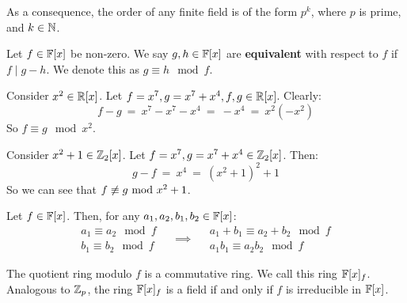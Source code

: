 \documentclass{article}
\begin{document}
\begin{crll}
    As a consequence, the order of any finite field is of the form $ p^{k} $,
    where $ p $ is prime, and $ k \in \mathbb{N} $.
\end{crll}


\begin{defn}
    Let $ f \in \mathbb{F}[x] $ be non-zero.
    We say $ g, h \in \mathbb{F}[x] $ are \textbf{equivalent} with respect to $ f $ if
    $ f \mid g - h $. \vsp
    We denote this as $ g \equiv h \mod f $.
\end{defn}

\begin{xmp}[source=Primary Source Material]
    Consider $ x^{2} \in \mathbb{R}[x] $. Let $ f = x^{7}, g = x^{7} + x^{4}, f, g \in \mathbb{R}[x] $.
    Clearly:
    \begin{equation*}
        f - g \ = \ x^{7} - x^{7} - x^{4} \ = \ -x^{4} \ = \ x^{2}(-x^{2})
    \end{equation*}
    So $ f \equiv g \mod x^{2} $.
\end{xmp}

\begin{xmp}[source=Primary Source Material]
    Consider $ x^{2} + 1 \in \mathbb{Z}_{2}[x] $.
    Let $ f = x^{7}, g = x^{7} + x^{4} \in \mathbb{Z}_{2}[x] $. Then:
    \begin{equation*}
        g - f \ = \ x^{4} \ = \ (x^{2} + 1)^{2} + 1
    \end{equation*}
    So we can see that $ f \cnot\equiv g \mod x^{2} + 1 $.
\end{xmp}

\begin{lm}
    Let $ f \in \mathbb{F}[x] $.
    Then, for any $ a_{1}, a_{2}, b_{1}, b_{2} \in \mathbb{F}[x] $:
    \begin{equation*}
        \begin{matrix} a_{1} \equiv a_{2} \mod f \\ b_{1} \equiv b_{2} \mod f \end{matrix}
        \quad \implies \quad \begin{matrix} a_{1} + b_{1} \equiv a_{2} + b_{2} \mod f \\
        a_{1}b_{1} \equiv a_{2}b_{2} \mod f \end{matrix}
    \end{equation*}
\end{lm}

\begin{crll}
    The quotient ring modulo $ f $ is a commutative ring.
    We call this ring $ \mathbb{F}[x]_{f} $. \vsp
    Analogous to $ \mathbb{Z}_{p} $, the ring $ \mathbb{F}[x]_{f} $ is a field if and only if $ f $ is
    irreducible in $ \mathbb{F}[x] $.
\end{crll}
\end{document}
